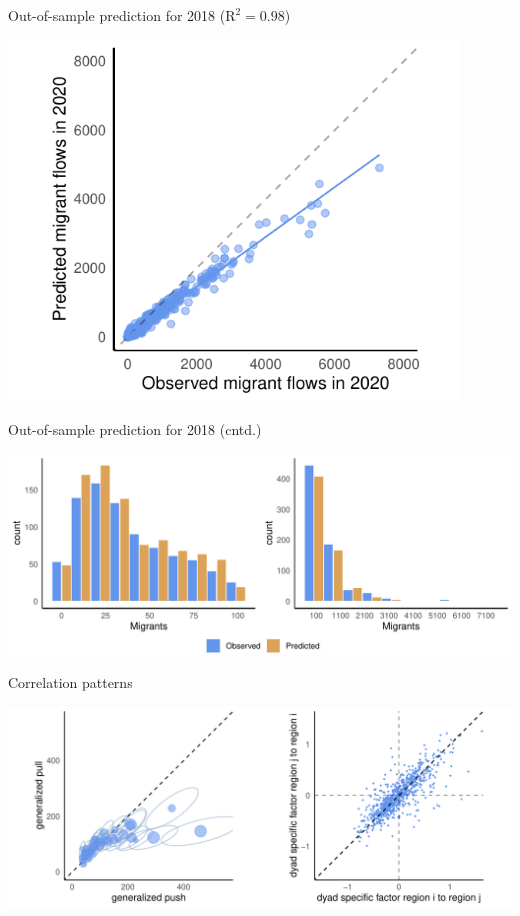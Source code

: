 \documentclass{beamer}
\begin{document}
\begin{frame}{Out-of-sample prediction for 2018 ($\text{R}^{2} = 0.98$)}
	\begin{center}
		\includegraphics[width=0.9\textwidth]{../../fig/prediction_2020}
	\end{center}
\end{frame}

\begin{frame}{Out-of-sample prediction for 2018 (cntd.)}
	\begin{center}
		\includegraphics[width=1\textwidth]{../../fig/hist_fit}
	\end{center}
\end{frame}

\begin{frame}{Correlation patterns}
	\begin{center}
		\includegraphics[width=1\textwidth]{../../fig/country_dyad}
	\end{center}
\end{frame}
\end{document}
